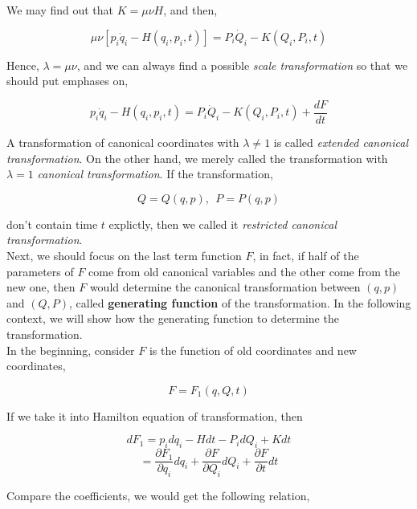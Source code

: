 \documentclass[12pt]{article}
\numberwithin{equation}{section}
\begin{document}
We may find out that $K = \mu \nu H$, and then,

\begin{center}
    \[ \mu \nu \left[ p_i\dot{q}_i - H(q_i, p_i, t) \right] = P_i\dot{Q}_i - K(Q_i, P_i, t) \]
\end{center}

Hence, $\lambda = \mu \nu$, and we can always find a possible \textit{scale transformation} so that we should put emphases on,

\begin{center}
    \[ p_i\dot{q}_i - H(q_i, p_i, t) = P_i\dot{Q}_i - K(Q_i, P_i, t) + \frac{dF}{dt} \]
\end{center}

A transformation of canonical coordinates with $\lambda \ne 1$ is called \textit{extended canonical transformation}. On the other hand, we merely called the transformation with $\lambda = 1$ \textit{canonical transformation}. If the transformation, 

\begin{center}
    \[ Q = Q(q, p),\ \ P = P(q, p) \]
\end{center}

\noindent don't contain time $t$ explictly, then we called it \textit{restricted canonical transformation}.
\\
\indent Next, we should focus on the last term function $F$, in fact, if half of the parameters of $F$ come from old canonical variables and the other come from the new one, then $F$ would determine the canonical transformation between $(q, p)$ and $(Q, P)$, called \textbf{generating function} of the transformation. In the following context, we will show how the generating function to determine the transformation.
\\
\indent In the beginning, consider $F$ is the function of old coordinates and new coordinates,

\begin{center}
    \[ F = F_1(q, Q, t) \]
\end{center}

If we take it into Hamilton equation of transformation, then

\begin{center}
    \[ dF_1 = p_idq_i - Hdt - P_idQ_i + Kdt \]
    \[ = \frac{\partial F_1}{\partial q_i} dq_i + \frac{\partial F}{\partial Q_i}dQ_i + \frac{\partial F}{\partial t}dt \]
\end{center}

Compare the coefficients, we would get the following relation,
\end{document}
